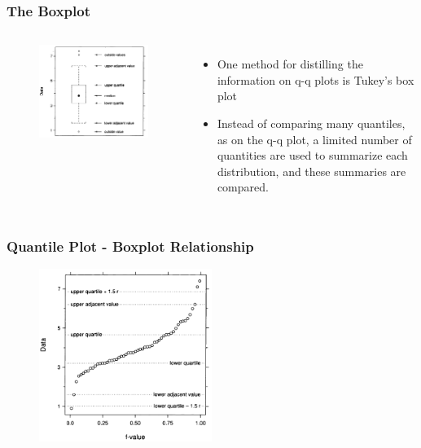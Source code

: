 \documentclass[aspectratio=1610]{beamer}
\begin{document}
\begin{frame}
	\frametitle{The Boxplot}
	\begin{columns}
		\begin{figure}
			\begin{center}
				\includegraphics[width=1.0\textwidth]{figures/boxplot.png}
			\end{center}
		\end{figure}
		\begin{itemize}
			\item One method for distilling the information on q-q plots is Tukey's box
			      plot
			\item Instead of comparing many quantiles, as on the q-q plot, a
			      limited number of quantities are used to summarize each distribution, and
			      these summaries are compared.
		\end{itemize}
	\end{columns}
\end{frame}

\begin{frame}
	\frametitle{Quantile Plot - Boxplot Relationship}
	\begin{figure}
		\begin{center}
			\includegraphics[width=0.5\textwidth]{figures/boxplot_explained.png}
		\end{center}
	\end{figure}
\end{frame}
\end{document}
